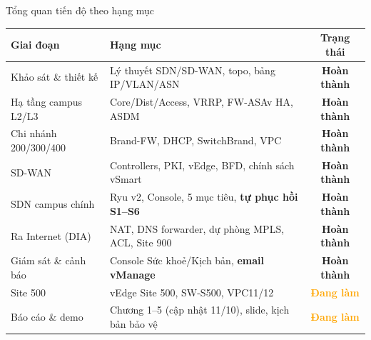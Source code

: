 \documentclass[aspectratio=169, 10pt]{beamer}
\newcommand{\done}{\textcolor{doneGreen}{\textbf{Hoàn thành}}}
\newcommand{\doing}{\textcolor{orange}{\textbf{Đang làm}}}
\begin{document}
\begin{frame}{Tổng quan tiến độ theo hạng mục}
    \centering
    \small
    \begin{tabular}{@{}llc@{}}
        \toprule
        \textbf{Giai đoạn} & \textbf{Hạng mục} & \textbf{Trạng thái} \\
        \midrule
        Khảo sát \& thiết kế    & Lý thuyết SDN/SD-WAN, topo, bảng IP/VLAN/ASN   & \done \\
        Hạ tầng campus L2/L3    & Core/Dist/Access, VRRP, FW-ASAv HA, ASDM       & \done \\
        Chi nhánh 200/300/400   & Brand-FW, DHCP, SwitchBrand, VPC              & \done \\
        SD-WAN                  & Controllers, PKI, vEdge, BFD, chính sách vSmart & \done \\
        SDN campus chính        & Ryu v2, Console, 5 mục tiêu, \textbf{tự phục hồi S1--S6} & \done \\
        Ra Internet (DIA)       & NAT, DNS forwarder, dự phòng MPLS, ACL, Site 900 & \done \\
        Giám sát \& cảnh báo    & Console Sức khoẻ/Kịch bản, \textbf{email vManage} & \done \\
        Site 500                & vEdge Site 500, SW-S500, VPC11/12              & \doing \\
        Báo cáo \& demo         & Chương 1--5 (cập nhật 11/10), slide, kịch bản bảo vệ & \doing \\
        \bottomrule
    \end{tabular}
\end{frame}
\end{document}
